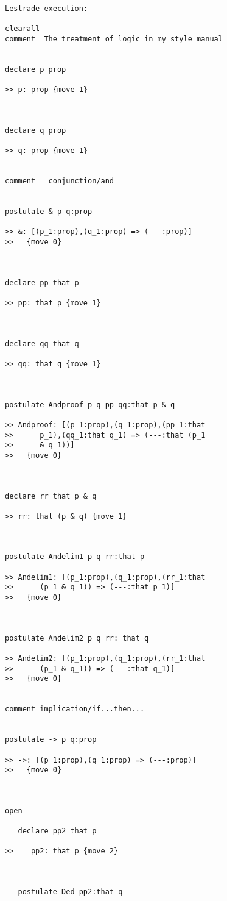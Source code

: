 \begin{verbatim}Lestrade execution:

clearall
comment  The treatment of logic in my style manual


declare p prop

>> p: prop {move 1}



declare q prop

>> q: prop {move 1}


comment   conjunction/and


postulate & p q:prop

>> &: [(p_1:prop),(q_1:prop) => (---:prop)]
>>   {move 0}



declare pp that p

>> pp: that p {move 1}



declare qq that q

>> qq: that q {move 1}



postulate Andproof p q pp qq:that p & q

>> Andproof: [(p_1:prop),(q_1:prop),(pp_1:that
>>      p_1),(qq_1:that q_1) => (---:that (p_1
>>      & q_1))]
>>   {move 0}



declare rr that p & q

>> rr: that (p & q) {move 1}



postulate Andelim1 p q rr:that p

>> Andelim1: [(p_1:prop),(q_1:prop),(rr_1:that
>>      (p_1 & q_1)) => (---:that p_1)]
>>   {move 0}



postulate Andelim2 p q rr: that q

>> Andelim2: [(p_1:prop),(q_1:prop),(rr_1:that
>>      (p_1 & q_1)) => (---:that q_1)]
>>   {move 0}


comment implication/if...then...


postulate -> p q:prop

>> ->: [(p_1:prop),(q_1:prop) => (---:prop)]
>>   {move 0}



open

   declare pp2 that p

>>    pp2: that p {move 2}



   postulate Ded pp2:that q


\end{verbatim}
